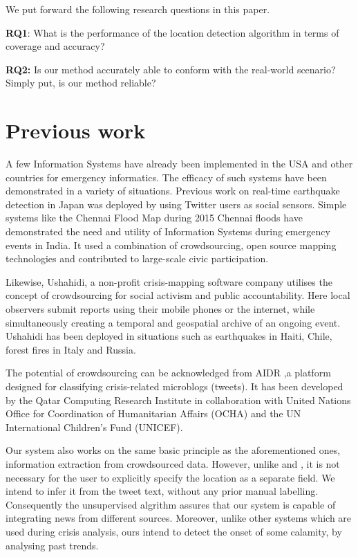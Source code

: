 \documentclass[journal, a4paper]{IEEEtran}
\begin{document}
	We put forward the following research questions in this paper. 
	
	\textbf{RQ1}: What is the performance of the location detection algorithm in terms of coverage and accuracy?
	
\textbf{RQ2:} Is our method accurately able to conform with the real-world scenario? Simply put, is our method reliable?
	
\section{Previous work}	

	A few Information Systems have already been implemented in the USA and other countries for emergency informatics.
	The efficacy of such systems have been demonstrated in a variety of situations. Previous work on real-time earthquake detection in Japan was deployed by \cite{Sakaki} using Twitter users as social sensors. 
	 Simple systems like the Chennai Flood Map \cite{Mapbox} during 2015 Chennai floods have demonstrated the need and utility of Information Systems during emergency events in India. It used a combination of crowdsourcing, open source mapping technologies and contributed to large-scale civic participation. 
	 
	 Likewise, Ushahidi,\cite{Ushahidi} a non-profit crisis-mapping software company utilises the concept of crowdsourcing for social activism and public accountability. Here local observers submit reports using their mobile phones or the internet, while simultaneously creating a temporal and geospatial archive of an ongoing event. Ushahidi has been deployed in situations such as earthquakes in Haiti, Chile, forest fires in Italy and Russia.
	
	The potential of crowdsourcing can be acknowledged from AIDR \cite{AIDR},a platform designed for classifying crisis-related microblogs (tweets). It has been developed by the Qatar Computing Research Institute in collaboration with United Nations Office for Coordination of Humanitarian Affairs (OCHA) and the UN International Children’s Fund (UNICEF).
	
	Our system also works on the same basic principle as the aforementioned ones, information extraction from crowdsourced data. However, unlike \cite{Mapbox} and \cite{Ushahidi}, it is not necessary for the user to explicitly specify the location as a separate field. We intend to infer it from the tweet text, without any prior manual labelling. Consequently the unsupervised algrithm assures that our system is capable of integrating news from different sources. Moreover, unlike other systems which are used during crisis analysis, ours intend to detect the onset of some calamity, by analysing past trends. 
	
\end{document}

